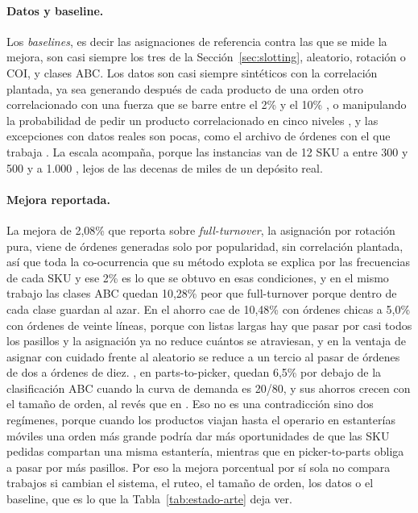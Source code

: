\paragraph{Datos y baseline.}
Los \emph{baselines}, es decir las asignaciones de referencia contra las que se mide la mejora, son casi siempre los tres de la Sección~\ref{sec:slotting}, aleatorio, rotación o COI, y clases ABC.
Los datos son casi siempre sintéticos con la correlación plantada, ya sea generando después de cada producto de una orden otro correlacionado con una fuerza que se barre entre el 2\% y el 10\% \citep{xu2020dynamic}, o manipulando la probabilidad de pedir un producto correlacionado en cinco niveles \citep{mirzaei2021integrated}, y las excepciones con datos reales son pocas, como el archivo de órdenes con el que trabaja \citet{debold2025storage}.
La escala acompaña, porque las instancias van de 12 SKU \citep{mantel2007order} a entre 300 y 500 \citep{mirzaei2021integrated} y a 1.000 \citep{zhang2016correlated}, lejos de las decenas de miles de un depósito real.

\paragraph{Mejora reportada.}
La mejora de 2,08\% que \citet{zhang2016correlated} reporta sobre \emph{full-turnover}, la asignación por rotación pura, viene de órdenes generadas solo por popularidad, sin correlación plantada, así que toda la co-ocurrencia que su método explota se explica por las frecuencias de cada SKU y ese 2\% es lo que se obtuvo en esas condiciones, y en el mismo trabajo las clases ABC quedan 10,28\% peor que full-turnover porque dentro de cada clase guardan al azar.
En \citet{xu2020dynamic} el ahorro cae de 10,48\% con órdenes chicas a 5,0\% con órdenes de veinte líneas, porque con listas largas hay que pasar por casi todos los pasillos y la asignación ya no reduce cuántos se atraviesan, y en \citet{mantel2007order} la ventaja de asignar con cuidado frente al aleatorio se reduce a un tercio al pasar de órdenes de dos a órdenes de diez.
\citet{mirzaei2021integrated}, en parts-to-picker, quedan 6,5\% por debajo de la clasificación ABC cuando la curva de demanda es 20/80, y sus ahorros crecen con el tamaño de orden, al revés que en \citet{xu2020dynamic}.
Eso no es una contradicción sino dos regímenes, porque cuando los productos viajan hasta el operario en estanterías móviles una orden más grande podría dar más oportunidades de que las SKU pedidas compartan una misma estantería, mientras que en picker-to-parts obliga a pasar por más pasillos.
Por eso la mejora porcentual por sí sola no compara trabajos si cambian el sistema, el ruteo, el tamaño de orden, los datos o el baseline, que es lo que la Tabla~\ref{tab:estado-arte} deja ver.

